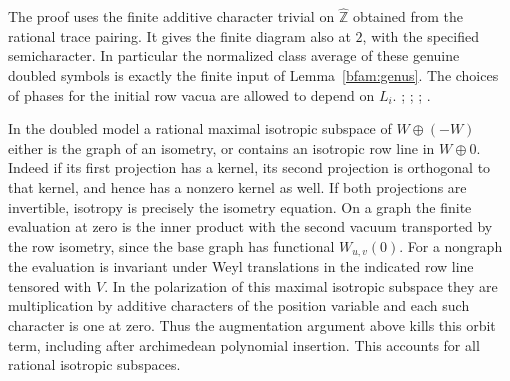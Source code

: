 The proof uses the finite additive character trivial on
\(\widehat{\mathbb Z}\) obtained from the rational trace pairing.
It gives the finite diagram also at \(2\), with the specified
semicharacter. In particular the normalized class average of
these genuine doubled symbols is exactly the finite input of
Lemma~\ref{bfam:genus}. The choices of phases for the initial
row vacua are allowed to depend on \(L_i\).
;
;
;
.

In the doubled model a rational maximal isotropic subspace of
\(W\oplus(-W)\) either is the graph of an isometry, or contains an
isotropic row line in \(W\oplus0\). Indeed if its first projection
has a kernel, its second projection is orthogonal to that kernel,
and hence has a nonzero kernel as well. If both projections are
invertible, isotropy is precisely the isometry equation. On a
graph the finite evaluation at zero is the inner product with the
second vacuum transported by the row isometry, since the base
graph has functional \(W_{u,v}(0)\). For a nongraph the evaluation
is invariant under Weyl translations in the indicated row line
tensored with \(V\). In the polarization of this maximal isotropic
subspace they are multiplication by additive characters of the
position variable and each such character is one at zero. Thus
the augmentation argument above kills this orbit term, including
after archimedean polynomial insertion. This accounts for all
rational isotropic subspaces.

